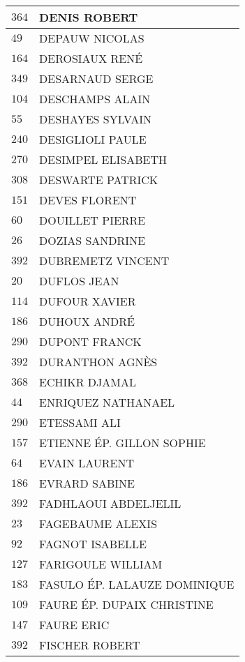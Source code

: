 \begin{xltabular}{\linewidth}{|l|X|}
    \hline
    $364$ & DENIS ROBERT \\
    \hline
    $49$ & DEPAUW NICOLAS \\
    \hline
    $164$ & DEROSIAUX RENÉ \\
    \hline
    $349$ & DESARNAUD SERGE \\
    \hline
    $104$ & DESCHAMPS ALAIN \\
    \hline
    $55$ & DESHAYES SYLVAIN \\
    \hline
    $240$ & DESIGLIOLI PAULE \\
    \hline
    $270$ & DESIMPEL ELISABETH \\
    \hline
    $308$ & DESWARTE PATRICK \\
    \hline
    $151$ & DEVES FLORENT \\
    \hline
    $60$ & DOUILLET PIERRE \\
    \hline
    $26$ & DOZIAS SANDRINE \\
    \hline
    $392$ & DUBREMETZ VINCENT \\
    \hline
    $20$ & DUFLOS JEAN \\
    \hline
    $114$ & DUFOUR XAVIER \\
    \hline
    $186$ & DUHOUX ANDRÉ \\
    \hline
    $290$ & DUPONT FRANCK \\
    \hline
    $392$ & DURANTHON AGNÈS \\
    \hline
    $368$ & ECHIKR DJAMAL \\
    \hline
    $44$ & ENRIQUEZ NATHANAEL \\
    \hline
    $290$ & ETESSAMI ALI \\
    \hline
    $157$ & ETIENNE ÉP. GILLON SOPHIE \\
    \hline
    $64$ & EVAIN LAURENT \\
    \hline
    $186$ & EVRARD SABINE \\
    \hline
    $392$ & FADHLAOUI ABDELJELIL \\
    \hline
    $23$ & FAGEBAUME ALEXIS \\
    \hline
    $92$ & FAGNOT ISABELLE \\
    \hline
    $127$ & FARIGOULE WILLIAM \\
    \hline
    $183$ & FASULO ÉP. LALAUZE DOMINIQUE \\
    \hline
    $109$ & FAURE ÉP. DUPAIX CHRISTINE \\
    \hline
    $147$ & FAURE ERIC \\
    \hline
    $392$ & FISCHER ROBERT \\

\end{xltabular}
